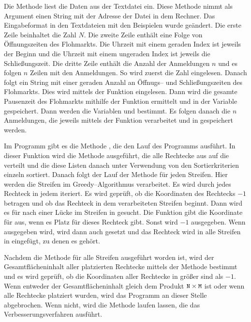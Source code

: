Die Methode  liest die Daten aus der Textdatei ein.
Diese Methode nimmt als Argument einen String mit der Adresse der Datei in dem Rechner.
Das Eingabeformat in den Textdateien mit den Beispielen wurde geändert.
Die erste Zeile beinhaltet die Zahl $N$. Die zweite Zeile enthält
eine Folge von Öffnungszeiten des Flohmarkts. Die Uhrzeit mit einem geraden Index ist jeweils der
Beginn und die Uhrzeit mit einem ungeraden Index ist jeweils die Schließungszeit.
Die dritte Zeile enthält die Anzahl der Anmeldungen $n$ und es folgen $n$ Zeilen mit den Anmeldungen.
So wird zuerst die Zahl  eingelesen. 
Danach folgt ein String mit einer geraden Anzahl an Öffnugs-- und Schließungszeiten des Flohmarkts.
Dies wird mittels der Funktion  eingelesen.
Dann wird die gesamte Pausenzeit des Flohmarkts mithilfe der Funktion  ermittelt
und in der Variable  gespeichert. 
Dann werden die Variablen  und  bestimmt.
Es folgen danach die $n$ Anmeldungen,
die jeweils mittels der Funktion  verarbeitet und
in  gespeichert werden.

Im Programm gibt es die Methode , die den Lauf des Programms ausführt.
In dieser Funktion wird die Methode  ausgeführt, die alle
Rechtecke aus  auf die 
 verteilt und die diese Listen danach unter Verwendung
von den Sortierkriterien  einzeln sortiert.
Danach folgt der Lauf der Methode  für jeden Streifen.
Hier werden die Streifen im Greedy--Algorithmus verarbeitet.
Es wird durch jedes Rechteck  in jedem   iteriert.
Es wird geprüft, ob die Koordinaten des Rechtecks  $-1$ betragen und ob das Rechteck
in dem verarbeiteten Streifen beginnt.
Dann wird es für  nach einer Lücke im Streifen in  gesucht.
Die Funktion  gibt die Koordinate  für  aus,
wenn es Platz für dieses Rechteck gibt. Sonst wird $-1$ ausgegeben.
Wenn  ausgegeben wird, wird dann auch  gesetzt und 
das Rechteck  wird in alle Streifen in  eingefügt, 
zu denen es gehört.

Nachdem die Methode  für alle Streifen ausgeführt worden ist,
wird der Gesamtflächeninhalt aller platzierten Rechtecke mittels der Methode 
 bestimmt und es wird geprüft, ob 
die Koordinaten aller Rechtecke in  größer sind als $-1$.
Wenn entweder der Gesamtflächeninhalt gleich dem Produkt $\texttt{N} \times \texttt{M}$ ist
oder wenn alle Rechtecke platziert wurden, wird das Programm an dieser Stelle abgebrochen.
Wenn nicht, wird die Methode  laufen lassen, die
das Verbesserungsverfahren ausführt.


